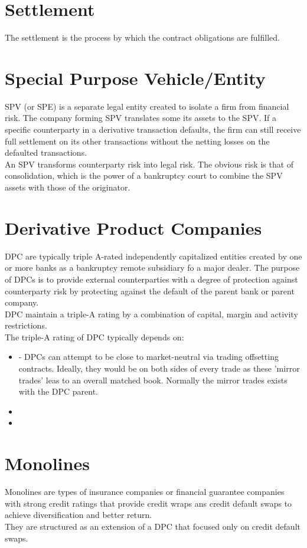 \section{Settlement}
The settlement is the process by which the contract obligations are fulfilled.

\section{Special Purpose Vehicle/Entity}
SPV (or SPE) is a separate legal entity created to isolate a firm from financial risk. The company forming SPV translates some its assets to the SPV. If a specific counterparty in a derivative transaction defaults, the firm can still receive full settlement on its other transactions without the netting losses on the defaulted transactions.\\
An SPV transforms counterparty risk into legal risk. The obvious risk is that of consolidation, which is the power of a bankruptcy court to combine the SPV assets with those of the originator.

\section{Derivative Product Companies}
DPC are typically triple A-rated independently capitalized entities created by one or more banks as a bankruptcy remote subsidiary fo a major dealer. The purpose of DPCs is to provide external counterparties with a degree of protection against counterparty risk by protecting against the default of the parent bank or parent company.\\
DPC maintain a triple-A rating by a combination of capital, margin and activity restrictions.\\
The triple-A rating of DPC typically depends on:
\begin{itemize}
	\item {} - DPCs can attempt to be close to market-neutral via trading offsetting contracts. Ideally, they would be on both sides of every trade as these 'mirror trades' leas to an overall matched book. Normally the mirror trades exists with the DPC parent.
	\item {}
	\item {}
\end{itemize}

\section{Monolines}
Monolines are types of insurance companies or financial guarantee companies with strong credit ratings that provide credit wraps ans credit default swaps to achieve diversification and better return.\\
They are structured as an extension of a DPC that focused only on credit default swaps.

